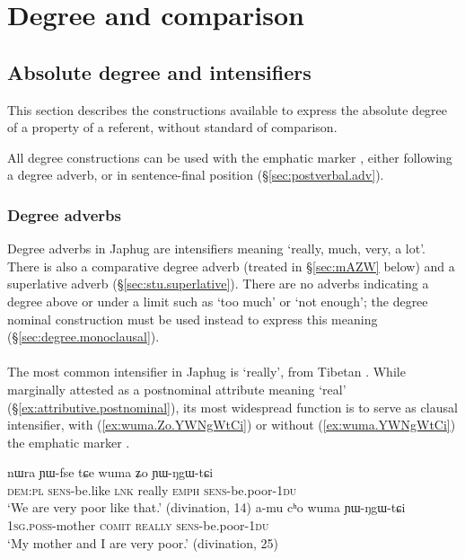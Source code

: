 \chapter{Degree and comparison} \label{chap:degree}
 
\section{Absolute degree and intensifiers} \label{sec:absolute.degree}
This section describes the constructions available to express the absolute degree of a property of a referent, without standard of comparison.

All degree constructions can be used with the emphatic marker , either following a degree adverb, or in sentence-final position (§\ref{sec:postverbal.adv}).

\subsection{Degree adverbs} \label{sec:degree.adverbs}
Degree adverbs in Japhug are intensifiers meaning `really, much, very, a lot'. There is also a comparative degree adverb  (treated in §\ref{sec:mAZW} below) and a superlative adverb  (§\ref{sec:stu.superlative}). There are no adverbs indicating a degree above or under a limit such as `too much' or `not enough'; the degree nominal construction must be used instead to express this meaning (§\ref{sec:degree.monoclausal}).


\subsubsection{} \label{sec:wuma}
The most common intensifier in Japhug is  `really', from Tibetan . While marginally attested as a postnominal attribute meaning `real' (§\ref{ex:attributive.postnominal}), its most widespread function is to serve as clausal intensifier, with (\ref{ex:wuma.Zo.YWNgWtCi}) or without (\ref{ex:wuma.YWNgWtCi}) the emphatic marker .

\begin{exe}
\ex 
\begin{xlist}
\ex \label{ex:wuma.Zo.YWNgWtCi}
\gll nɯra ɲɯ-fse tɕe wuma ʑo ɲɯ-ŋgɯ-tɕi \\
\textsc{dem}:\textsc{pl} \textsc{sens}-be.like \textsc{lnk} really \textsc{emph}  \textsc{sens}-be.poor-\textsc{1du} \\
\glt `We are very poor like that.' (divination, 14)
\ex \label{ex:wuma.YWNgWtCi}
\gll  a-mu cʰo wuma ɲɯ-ŋgɯ-tɕi  \\
\textsc{1sg}.\textsc{poss}-mother \textsc{comit} \textsc{really} \textsc{sens}-be.poor-\textsc{1du} \\
\glt `My mother and I are very poor.' (divination, 25)
\end{xlist}
\end{exe}

